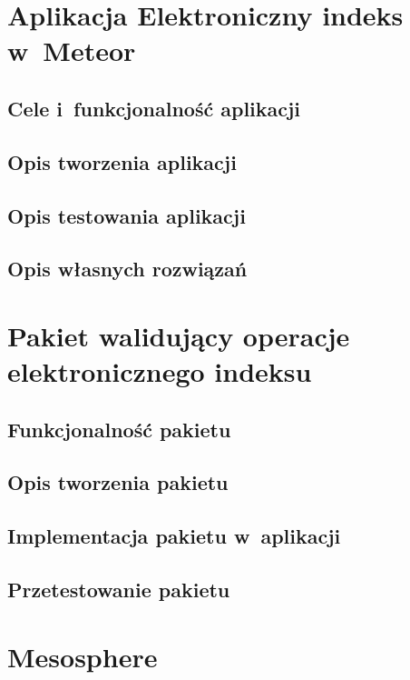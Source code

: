 \documentclass[brudnopis]{xmgr}
\begin{document}
\chapter{Aplikacja Elektroniczny indeks w~Meteor}

\section{Cele i~funkcjonalność aplikacji}

\section{Opis tworzenia aplikacji}
\cite{Introduction}
\cite{MeteorDocs}
\cite{DiscoverMeteor2013}
\cite{NodeDocs}
\cite{MongoDocs}
\cite{ScalingMongoDB2011}
\cite{ScalingWithMongoDB}
\section{Opis testowania aplikacji}
\cite{Laika}
\section{Opis własnych rozwiązań}


\chapter{Pakiet walidujący operacje elektronicznego indeksu}

\section{Funkcjonalność pakietu}
\section{Opis tworzenia pakietu}
\cite{Packages}
\cite{MeteorDocs}
\cite{DiscoverMeteor2013}
\section{Implementacja pakietu w~aplikacji}
\section{Przetestowanie pakietu}
\cite{TinyTest}

\summary

\appendix
\chapter{Mesosphere}
\end{document}
